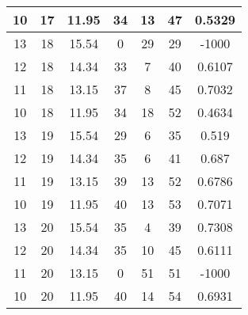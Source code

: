 \documentclass[letterpaper, 12pt]{article}
\begin{document}
\begin{longtable}{|c|c|c|c|c|c|c|}
10 & 17 & 11.95 & 34 & 13 & 47 & 0.5329 \\
\hline
13 & 18 & 15.54 & 0 & 29 & 29 & -1000 \\
\hline
12 & 18 & 14.34 & 33 & 7 & 40 & 0.6107 \\
\hline
11 & 18 & 13.15 & 37 & 8 & 45 & 0.7032 \\
\hline
10 & 18 & 11.95 & 34 & 18 & 52 & 0.4634 \\
\hline
13 & 19 & 15.54 & 29 & 6 & 35 & 0.519 \\
\hline
12 & 19 & 14.34 & 35 & 6 & 41 & 0.687 \\
\hline
11 & 19 & 13.15 & 39 & 13 & 52 & 0.6786 \\
\hline
10 & 19 & 11.95 & 40 & 13 & 53 & 0.7071 \\
\hline
13 & 20 & 15.54 & 35 & 4 & 39 & 0.7308 \\
\hline
12 & 20 & 14.34 & 35 & 10 & 45 & 0.6111 \\
\hline
11 & 20 & 13.15 & 0 & 51 & 51 & -1000 \\
\hline
10 & 20 & 11.95 & 40 & 14 & 54 & 0.6931 \\
\hline
\end{longtable}
\end{document}
